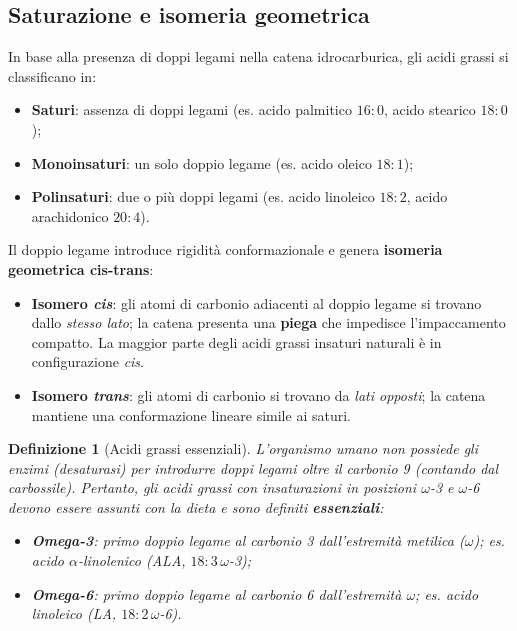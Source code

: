 \documentclass[12pt,a4paper]{report}
\newtheorem{definizione}{Definizione}[section]
\begin{document}
\subsection{Saturazione e isomeria geometrica}
In base alla presenza di doppi legami nella catena idrocarburica, gli acidi grassi si classificano in:
\begin{itemize}
\item \textbf{Saturi}: assenza di doppi legami (es. acido palmitico \(16:0\), acido stearico \(18:0\));
\item \textbf{Monoinsaturi}: un solo doppio legame (es. acido oleico \(18:1\));
\item \textbf{Polinsaturi}: due o più doppi legami (es. acido linoleico \(18:2\), acido arachidonico \(20:4\)).
\end{itemize}
Il doppio legame introduce rigidità conformazionale e genera \textbf{isomeria geometrica cis-trans}:
\begin{itemize}
\item \textbf{Isomero \textit{cis}}: gli atomi di carbonio adiacenti al doppio legame si trovano dallo \textit{stesso lato}; la catena presenta una \textbf{piega} che impedisce l'impaccamento compatto. La maggior parte degli acidi grassi insaturi naturali è in configurazione \textit{cis}.
\item \textbf{Isomero \textit{trans}}: gli atomi di carbonio si trovano da \textit{lati opposti}; la catena mantiene una conformazione lineare simile ai saturi.
\end{itemize}
\begin{definizione}[Acidi grassi essenziali]
L'organismo umano non possiede gli enzimi (desaturasi) per introdurre doppi legami oltre il carbonio 9 (contando dal carbossile). Pertanto, gli acidi grassi con insaturazioni in posizioni \(\omega\)-3 e \(\omega\)-6 devono essere assunti con la dieta e sono definiti \textbf{essenziali}:
\begin{itemize}
\item \textbf{Omega-3}: primo doppio legame al carbonio 3 dall'estremità metilica (\(\omega\)); es. acido \(\alpha\)-linolenico (ALA, \(18:3\,\omega\)-3);
\item \textbf{Omega-6}: primo doppio legame al carbonio 6 dall'estremità \(\omega\); es. acido linoleico (LA, \(18:2\,\omega\)-6).
\end{itemize}
\end{definizione}
\end{document}
